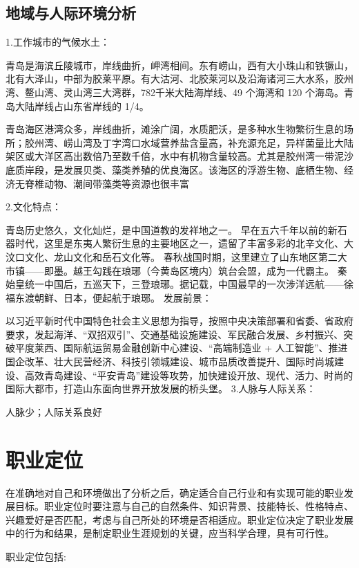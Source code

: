 \documentclass{article}
\begin{document}
\subsection{地域与人际环境分析}
1.工作城市的气候水土：\par
青岛是海滨丘陵城市，岸线曲折，岬湾相间。东有崂山，西有大小珠山和铁镢山，北有大泽山，中部为胶莱平原。有大沽河、北胶莱河以及沿海诸河三大水系，胶州湾、鳌山湾、灵山湾三大湾群，782千米大陆海岸线、49 个海湾和 120 个海岛。青岛大陆岸线占山东省岸线的 1/4。
\par
青岛海区港湾众多，岸线曲折，滩涂广阔，水质肥沃，是多种水生物繁衍生息的场所；胶州湾、崂山湾及丁字湾口水域营养盐含量高，补充源充足，异样菌量比大陆架区或大洋区高出数倍乃至数千倍，水中有机物含量较高。尤其是胶州湾一带泥沙底质岸段，是发展贝类、藻类养殖的优良海区。该海区的浮游生物、底栖生物、经济无脊椎动物、潮间带藻类等资源也很丰富\par
2.文化特点：\par
青岛历史悠久，文化灿烂，是中国道教的发祥地之一。 早在五六千年以前的新石器时代，这里是东夷人繁衍生息的主要地区之一，遗留了丰富多彩的北辛文化、大汶口文化、龙山文化和岳石文化等。 春秋战国时期，这里建立了山东地区第二大市镇——即墨。越王勾践在琅琊（今黄岛区境内）筑台会盟，成为一代霸主。
秦始皇统一中国后，五巡天下，三登琅琊。据记载，中国最早的一次涉洋远航——徐福东渡朝鲜、日本，便起航于琅琊。
发展前景：\par
以习近平新时代中国特色社会主义思想为指导，按照中央决策部署和省委、省政府要求，发起海洋、“双招双引”、交通基础设施建设、军民融合发展、乡村振兴、突破平度莱西、国际航运贸易金融创新中心建设、“高端制造业 + 人工智能”、推进国企改革、壮大民营经济、科技引领城建设、城市品质改善提升、国际时尚城建设、高效青岛建设、“平安青岛”建设等攻势，加快建设开放、现代、活力、时尚的国际大都市，打造山东面向世界开放发展的桥头堡。
3.人脉与人际关系：\par
人脉少；人际关系良好\par
\par
\par 

\begin{figure}[h!]
\centering

\end{figure}



\section{职业定位}
在准确地对自己和环境做出了分析之后，确定适合自己行业和有实现可能的职业发展目标。职业定位时要注意与自己的自然条件、知识背景、技能特长、性格特点、兴趣爱好是否匹配，考虑与自己所处的环境是否相适应。职业定位决定了职业发展中的行为和结果，是制定职业生涯规划的关键，应当科学合理，具有可行性。\par
职业定位包括:\par
\end{document}
